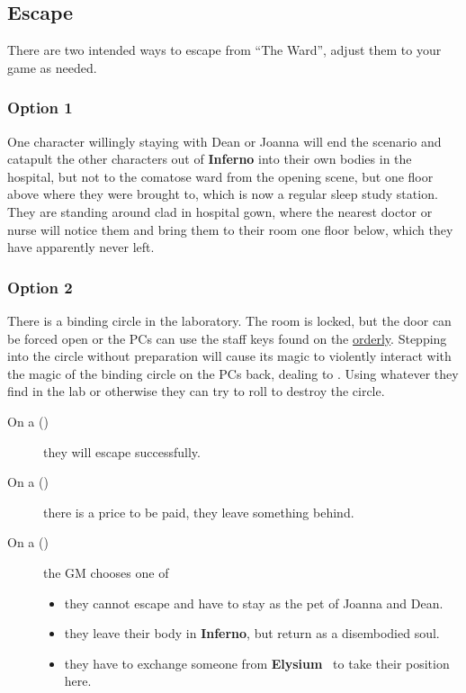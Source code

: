 \documentclass[bg-full]{resources/stylesheets/kult}
\begin{document}
\subsection{Escape}%
\label{sub:escape}

There are two intended ways to escape from “The Ward”, adjust them to your game as needed.

\subsubsection{Option 1}%
\label{ssub:escape_option1}
One character willingly staying with Dean or Joanna will end the scenario and catapult the other characters out of
\textbf{Inferno} into their own bodies in the hospital, but not to the comatose ward from the opening scene, but one floor
above where they were brought to, which is now a regular sleep study station.  They are standing around clad in hospital gown,
where the nearest doctor or nurse will notice them and bring them to their room one floor below, which they have apparently
never left.

\subsubsection{Option 2}%
\label{ssub:escape_option2}
There is a binding circle in the laboratory.  The room is locked, but the door can be forced open or the PCs can use the staff
keys found on the \hyperref[ssub:orderly]{orderly}.  Stepping into the circle without preparation will cause its magic to
violently interact with the magic of the binding circle on the PCs back, dealing  to .  Using whatever they find in the lab or otherwise they can try to roll  to
destroy the circle.

\begin{description}
  \item[On a ()] they will escape successfully.
  \item[On a ()] there is a price to be paid, they leave something behind.
  \item[On a ()] the GM chooses one of
        \begin{itemize}[noitemsep]
          \item they cannot escape and have to stay as the pet of Joanna and Dean.
          \item they leave their body in \textbf{Inferno}, but return as a disembodied soul.
          \item they have to exchange someone from \textbf{Elysium}~\cite[p.~224]{KULT:core} to take their position here.
        \end{itemize}
\end{description}
\end{document}
